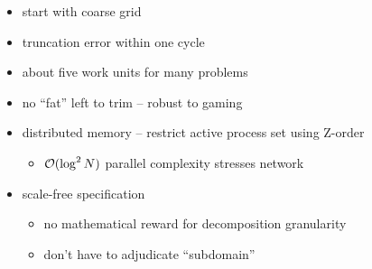 \documentclass{beamer}
\begin{document}
\begin{frame}[fragile]
\begin{figure}
\label{fig:FMG}
\end{figure}
\begin{itemize}
  \item start with coarse grid
  \item truncation error within one cycle
  \item about five work units for many problems
  \item no ``fat'' left to trim -- robust to gaming
  \item distributed memory -- restrict active process set using Z-order
    \begin{itemize}
    \item $\mathcal{O}(\log^2 N)$ parallel complexity stresses network
    \end{itemize}
  \item scale-free specification
    \begin{itemize}
    \item no mathematical reward for decomposition granularity
    \item don't have to adjudicate ``subdomain''
    \end{itemize}
\end{itemize}
\end{frame}
\end{document}
